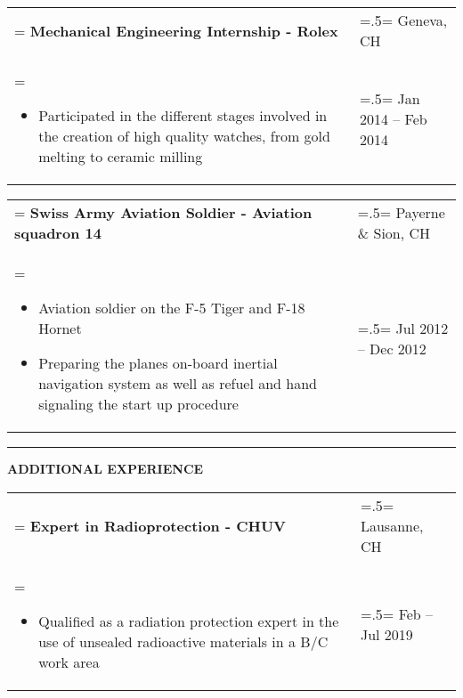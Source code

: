 \documentclass[letterpaper, 11pt]{article}
\begin{document}
\begin{tabularx}{1.0\textwidth} { 
   >{\raggedright\arraybackslash\hsize=1.5\hsize\linewidth=\hsize}X 
   >{\raggedleft\arraybackslash\hsize=.5\hsize\linewidth=\hsize}X }
\normalsize
\bf{Mechanical Engineering Internship - Rolex} & Geneva, CH\\
\normalfont \begin{itemize}[leftmargin=*,noitemsep,topsep=0pt]
\item Participated in the different stages involved in the creation of high quality watches, from gold melting to ceramic milling
\end{itemize} & Jan 2014 --  Feb 2014
\end{tabularx}

\begin{tabularx}{1.0\textwidth} { 
   >{\raggedright\arraybackslash\hsize=1.5\hsize\linewidth=\hsize}X 
   >{\raggedleft\arraybackslash\hsize=.5\hsize\linewidth=\hsize}X }
\normalsize
\bf{Swiss Army Aviation Soldier - Aviation squadron 14} & Payerne \& Sion, CH\\
\normalfont \begin{itemize}[leftmargin=*,noitemsep,topsep=0pt]
\item Aviation soldier on the F-5 Tiger and F-18 Hornet
\item Preparing the planes on-board inertial navigation system as well as refuel and hand signaling the start up procedure
\end{itemize} & Jul 2012 -- Dec 2012
\end{tabularx}

\begin{center}
\noindent\rule{0.75\textwidth}{1pt}
\end{center}

\begin{center}
\large\bf{ADDITIONAL EXPERIENCE}
\end{center}

\begin{tabularx}{1.0\textwidth} { 
   >{\raggedright\arraybackslash\hsize=1.5\hsize\linewidth=\hsize}X 
   >{\raggedleft\arraybackslash\hsize=.5\hsize\linewidth=\hsize}X }
\normalsize
\bf{Expert in Radioprotection - CHUV} & Lausanne, CH\\
\normalfont \begin{itemize}[leftmargin=*,noitemsep,topsep=0pt]
\item Qualified as a radiation protection expert in the use of unsealed radioactive materials in a B/C work area
\end{itemize} & Feb -- Jul 2019
\end{tabularx}
\end{document}
